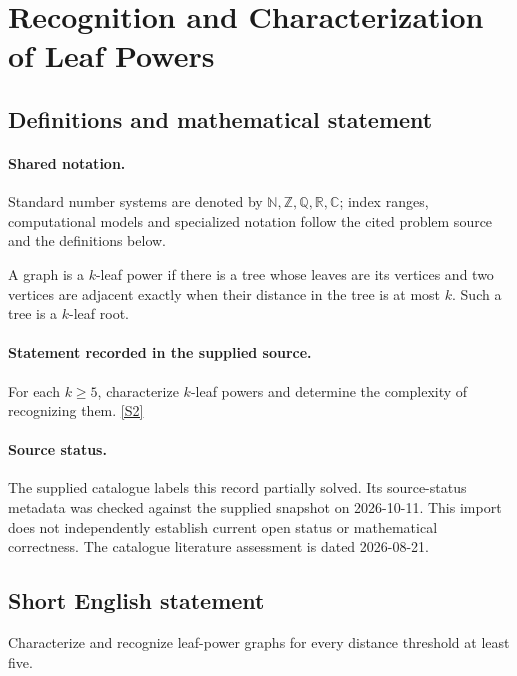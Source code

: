\documentclass[11pt]{article}
\newcommand{\sref}[2]{\hyperlink{source:#1:#2}{[S#2]}}
\begin{document}
\section{Recognition and Characterization of Leaf Powers}\label{statement}

\subsection{Definitions and mathematical statement}

\paragraph{Shared notation.}Standard number systems are denoted by $\mathbb N,\mathbb Z,\mathbb Q,\mathbb R,\mathbb C$; index ranges, computational models and specialized notation follow the cited problem source and the definitions below.


A graph is a $k$-leaf power if there is a tree whose leaves are its vertices and two vertices are adjacent exactly when their distance in the tree is at most $k$. Such a tree is a $k$-leaf root.
\paragraph{Statement recorded in the supplied source.}
For each $k\geq5$, characterize $k$-leaf powers and determine the complexity of recognizing them. \sref{statement}{2}
\paragraph{Source status.}
The supplied catalogue labels this record partially solved. Its source-status metadata was checked against the supplied snapshot on 2026-10-11. This import does not independently establish current open status or mathematical correctness. The catalogue literature assessment is dated 2026-08-21.
\subsection{Short English statement}
Characterize and recognize leaf-power graphs for every distance threshold at least five.
\end{document}
